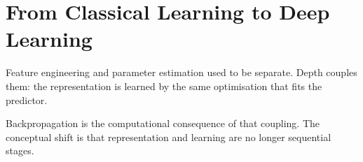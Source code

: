 \chapter{From Classical Learning to Deep Learning}
\label{ch:classical-to-deep}

Feature engineering and parameter estimation used to be separate. Depth couples them: the representation is learned by the same optimisation that fits the predictor.

Backpropagation is the computational consequence of that coupling. The conceptual shift is that representation and learning are no longer sequential stages.
